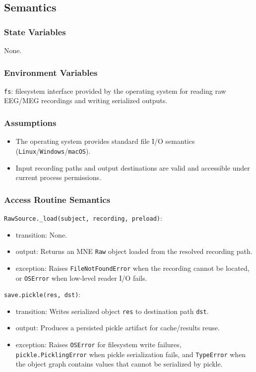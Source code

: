 \documentclass[12pt, titlepage]{article}
\begin{document}
\subsection{Semantics}

\subsubsection{State Variables}

None.

\subsubsection{Environment Variables}

\texttt{fs}: filesystem interface provided by the operating system for reading raw EEG/MEG recordings and writing serialized outputs.

\subsubsection{Assumptions}

\begin{itemize}
\item The operating system provides standard file I/O semantics
(\texttt{Linux}/\texttt{Windows}/\texttt{macOS}).
\item Input recording paths and output destinations are valid and accessible
under current process permissions.
\end{itemize}

\subsubsection{Access Routine Semantics}

\noindent \texttt{RawSource.\_load(subject, recording, preload)}:
\begin{itemize}
\item transition: None.
\item output: Returns an MNE \texttt{Raw} object loaded from the resolved
recording path.
\item exception: Raises \texttt{FileNotFoundError} when the recording cannot be
located, or \texttt{OSError} when low-level reader I/O fails.
\end{itemize}

\noindent \texttt{save.pickle(res, dst)}:
\begin{itemize}
\item transition: Writes serialized object \texttt{res} to destination path
\texttt{dst}.
\item output: Produces a persisted pickle artifact for cache/results reuse.
\item exception: Raises \texttt{OSError} for filesystem write failures, \texttt{pickle.PicklingError} when pickle serialization fails, and \texttt{TypeError} when the object graph contains values that cannot be serialized by pickle.
\end{itemize}
\end{document}
